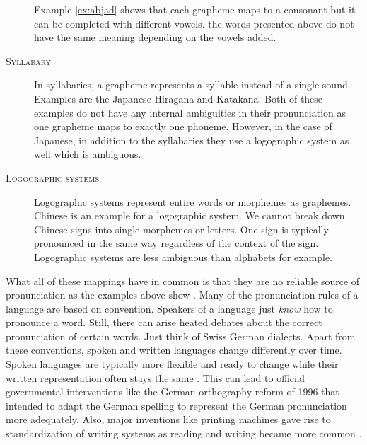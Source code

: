 \begin{description}
Example \ref{ex:abjad} shows that each grapheme maps to a consonant but it can be completed with different vowels. the words presented above do not have the same meaning depending on the vowels added. 

\item[\textsc{Syllabary}] In syllabaries, a grapheme represents a syllable instead of a single sound. Examples are the Japanese Hiragana and Katakana. Both of these examples do not have any internal ambiguities in their pronunciation as one grapheme maps to exactly one phoneme. However, in the case of Japanese, in addition to the syllabaries they use a logographic system as well which is ambiguous.  

\item[\textsc{Logographic systems}] Logographic systems represent entire words or morphemes as graphemes. Chinese is an example for a logographic system. We cannot break down Chinese signs into single morphemes or letters. One sign is typically pronounced in the same way regardless of the context of the sign. Logographic systems are less ambiguous than alphabets for example. 
\end{description}

What all of these mappings have in common is that they are no reliable source of pronunciation as the examples above show \citep{Intro.2007}. Many of the pronunciation rules of a language are based on convention. Speakers of a language just \textit{know} how to pronounce a word. Still, there can arise heated debates about the correct pronunciation of certain words. Just think of Swiss German dialects. Apart from these conventions, spoken and written languages change differently over time. Spoken languages are typically more flexible and ready to change while their written representation often stays the same \citep{unicode-lingu}. This can lead to official governmental interventions like the German orthography reform of 1996 that intended to adapt the German spelling to represent the German pronunciation more adequately. Also, major inventions like printing machines gave rise to standardization of writing systems as reading and writing became more common \citep{writing-systems}.

